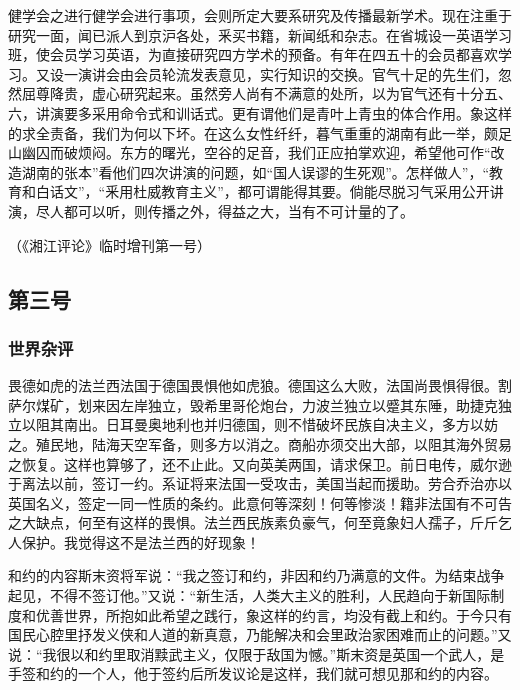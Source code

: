 健学会之进行健学会进行事项，会则所定大要系研究及传播最新学术。现在注重于研究一面，闻已派人到京沪各处，釆买书籍，新闻纸和杂志。在省城设一英语学习班，使会员学习英语，为直接研究四方学术的预备。有年在四五十的会员都喜欢学习。又设一演讲会由会员轮流发表意见，实行知识的交换。官气十足的先生们，忽然屈尊降贵，虚心研究起来。虽然旁人尚有不满意的处所，以为官气还有十分五、六，讲演要多采用命令式和训话式。更有谓他们是青叶上青虫的体合作用。象这样的求全责备，我们为何以下坏。在这么女性纤纤，暮气重重的湖南有此一举，颇足山幽囚而破烦闷。东方的曙光，空谷的足音，我们正应拍掌欢迎，希望他可作“改造湖南的张本”看他们四次讲演的问题，如“国人误谬的生死观”。怎样做人”，“教育和白话文”，“釆用杜威教育主义”，都可谓能得其要。倘能尽脱习气采用公开讲演，尽人都可以听，则传播之外，得益之大，当有不可计量的了。

\begin{flushright}（《湘江评论》临时增刊第一号）
\end{flushright}

\subsection[第三号（一九一九年七月二十八日）]{第三号}

\subsubsection{世界杂评}

畏德如虎的法兰西法国于德国畏惧他如虎狼。德国这么大败，法国尚畏惧得很。割萨尔煤矿，划来因左岸独立，毁希里哥伦炮台，力波兰独立以蹙其东陲，助捷克独立以阻其南出。日耳曼奥地利也并归德国，则不惜破坏民族自决主义，多方以妨之。殖民地，陆海天空军备，则多方以消之。商船亦须交出大部，以阻其海外贸易之恢复。这样也算够了，还不止此。又向英美两国，请求保卫。前日电传，威尔逊于离法以前，签订一约。系证将来法国一受攻击，美国当起而援助。劳合乔治亦以英国名义，签定一同一性质的条约。此意何等深刻！何等惨淡！籍非法国有不可告之大缺点，何至有这样的畏惧。法兰西民族素负豪气，何至竟象妇人孺子，斤斤乞人保护。我觉得这不是法兰西的好现象！

和约的内容斯末资将军说：“我之签订和约，非因和约乃满意的文件。为结束战争起见，不得不签订他。”又说：“新生活，人类大主义的胜利，人民趋向于新国际制度和优善世界，所抱如此希望之践行，象这样的约言，均没有截上和约。于今只有国民心腔里抒发义侠和人道的新真意，乃能解决和会里政治家困难而止的问题。”又说：“我很以和约里取消黩武主义，仅限于敌国为憾。”斯末资是英国一个武人，是手签和约的一个人，他于签约后所发议论是这样，我们就可想见那和约的内容。

